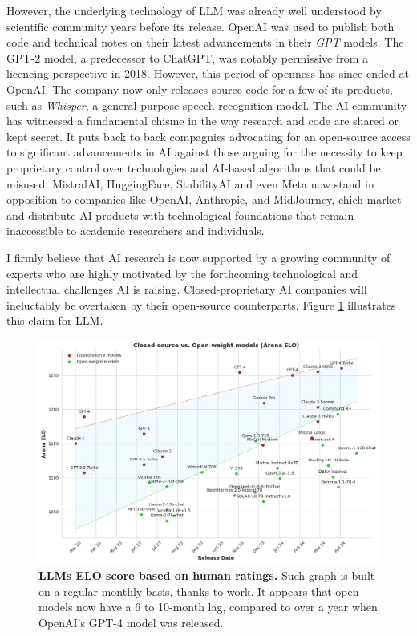 However, the underlying technology of \ac{LLM} was already well understood by scientific community years before its release. OpenAI was used to publish both code and technical notes on their latest advancements in their \textit{GPT} models. The GPT-2 model, a predecessor to ChatGPT, was notably permissive from a licencing perspective in 2018. However, this period of openness has since ended at OpenAI. The company now only releases source code for a few of its products, such as \textit{Whisper}, a general-purpose speech recognition model. The \ac{AI} community has witnessed a fundamental chisme in the way research and code are shared or kept secret. It puts back to back compagnies advocating for an open-source access to significant advancements in \ac{AI} against those arguing for the necessity to keep proprietary control over technologies and \ac{AI}-based algorithms that could be misused. MistralAI, HuggingFace, StabilityAI and even Meta now stand in opposition to companies like OpenAI, Anthropic, and MidJourney, chich market and distribute \ac{AI} products with technological foundations that remain inaccessible to academic researchers and individuals. 

I firmly believe that \ac{AI} research is now supported by a growing community of experts who are highly motivated by the forthcoming technological and intellectual challenges \ac{AI} is raising. Closed-proprietary \ac{AI} companies will ineluctably be overtaken by their open-source counterparts. Figure \ref{fig:conclusion-openclose} illustrates this claim for \ac{LLM}. 
\begin{figure}[htb!]
    \center
  \includegraphics[width=\linewidth]{images/conclusion/open-close.jpeg}
  \caption{\textbf{LLMs ELO score based on human ratings.} Such graph is built on a regular monthly basis, thanks to \citep{chiang2024chatbot} work. It appears that open models now have a 6 to 10-month lag, compared to over a year when OpenAI's GPT-4 model was released.}
  \label{fig:conclusion-openclose}
\end{figure}


